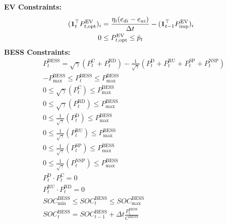 \documentclass[conference]{IEEEtran}
\begin{document}
\noindent \textbf{EV Constraints:}
\begin{align}
    (\mathbf{1}_t^\top P^{\rm EV}_{t,\text{opt}})_i &= \frac{\eta_i (e_{di} - e_{ai})}{\Delta{t}} - (\mathbf{1}_{t-1}^\top P^{\rm EV}_{\text{imp}})_i \label{eq:EV_dynamic} \\
%    
    0 &\leq P^{\rm EV}_{t,\text{opt}} \leq \hat{p}_t \label{eq:EV_physical}
\end{align}
%
\textbf{BESS Constraints:}
\begin{align}
    &P^{\text{BESS}}_t = \sqrt{\gamma}(P^{\text{C}}_{t} +  P^{{\text{RD}}}_t) 
    - \frac{1}{\sqrt{\gamma}}(P^{\text{D}}_{t} +  P^{{\text{RU}}}_t +  P^{{\text{SP}}}_t + P^{{\text{NSP}}}_t) \label{eq:BESS_load} \\
%    
    &-P^{\text{BESS}}_{\text{max}} \leq P^{\text{BESS}}_t \leq P^{\text{BESS}}_{\text{max}} \label{eq:BESS_physical} \\
%    
    &0 \leq \sqrt{\gamma}(P^{\text{C}}_t)\leq P^{\text{BESS}}_{\text{max}}\\
%    
    &0 \leq \sqrt{\gamma}(P^{\text{RD}}_t)\leq P^{\text{BESS}}_{\text{max}}\\
%
    &0 \leq \frac{1}{\sqrt{\gamma}}(P^{\text{D}}_t)\leq P^{\text{BESS}}_{\text{max}}\\
%
    &0 \leq \frac{1}{\sqrt{\gamma}}(P^{\text{RU}}_t)\leq P^{\text{BESS}}_{\text{max}}\\%
%    
    &0 \leq \frac{1}{\sqrt{\gamma}}(P^{\text{SP}}_t)\leq P^{\text{BESS}}_{\text{max}}\\%
%  
    &0 \leq \frac{1}{\sqrt{\gamma}}(P^{\text{NSP}}_t)\leq P^{\text{BESS}}_{\text{max}}\\       
%
    &P^\text{D}_t \cdot P^{\text{C}}_t =0\\
%    
    &P^{{\text{RU}}}_t \cdot P^{{\text{RD}}}_t =0\\
    &SOC^{\text{BESS}}_{\text{min}}  \leq SOC^{\text{BESS}}_t 
    \leq SOC^{\text{BESS}}_{\text{max}} \label{eq:SOC_physical} \\ 
%
    &SOC^{\text{BESS}}_t = SOC^{\text{BESS}}_{t-1} + \Delta{t} \frac{P^{\text{BESS}}_t}{C^{BESS}} \label{eq:SOC_dynamic} \\
%    
\end{align}
\end{document}
